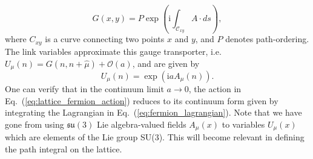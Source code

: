 \begin{equation}
    G(x, y)=P \exp \left(\mathrm{i} \int_{\mathcal{C}_{x y}} A \cdot d s\right),
\end{equation}
where $C_{xy}$ is a curve connecting two points $x$ and $y$, and $P$ denotes path-ordering. The link variables approximate this gauge transporter, i.e.\ $U_\mu(n) = G(n, n+\hat \mu) + \mathcal O(a)$, and are given by
\begin{equation}
    U_{\mu}(n)=\exp \left(\mathrm{i} a A_{\mu}(n)\right).
\end{equation}
One can verify that in the continuum limit $a\rightarrow 0$, the action in Eq.~(\ref{eq:lattice_fermion_action}) reduces to its continuum form given by integrating the Lagrangian in Eq.~(\ref{eq:fermion_lagrangian}). Note that we have gone from using $\mathfrak{su}(3)$ Lie algebra-valued fields $A_\mu(x)$ to variables $U_\mu(x)$ which are elements of the Lie group SU(3). This will become relevant in defining the path integral on the lattice.
